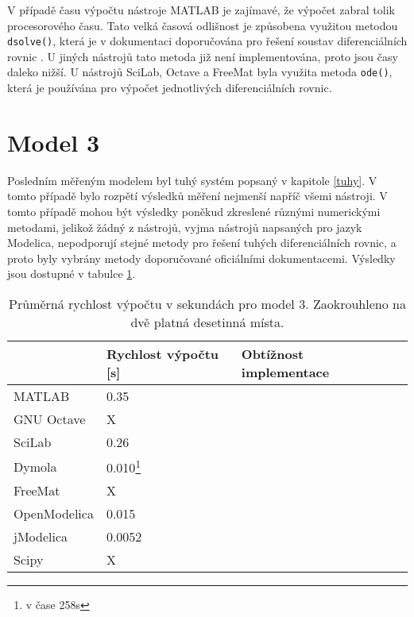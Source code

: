 
V případě času výpočtu nástroje MATLAB je zajímavé, že výpočet zabral tolik procesorového času. Tato velká časová odlišnost je způsobena využitou metodou \texttt{dsolve()}, která je v dokumentaci doporučována pro řešení soustav diferenciálních rovnic \cite{MATLAB:2010}. U jiných nástrojů tato metoda již není implementována, proto jsou časy daleko nižší. U nástrojů SciLab, Octave a FreeMat byla využita metoda \texttt{ode()}, která je používána pro výpočet jednotlivých diferenciálních rovnic.

\section{Model 3}
\label{srovnani-tuhy}
Posledním měřeným modelem byl tuhý systém popsaný v kapitole \ref{tuhy}. V tomto případě bylo rozpětí výsledků měření nejmenší napříč všemi nástroji. V tomto případě mohou být výsledky poněkud zkreslené různými numerickými metodami, jelikož žádný z nástrojů, vyjma nástrojů napsaných pro jazyk Modelica, nepodporují stejné metody pro řešení tuhých diferenciálních rovnic, a proto byly vybrány metody doporučované oficiálními dokumentacemi. Výsledky jsou dostupné v tabulce \ref{tab:tuhy-tabulka}.
\begin{savenotes}
\begin{table}[ht]
\centering
\begin{tabular}{|l|l|l|l|}
\hline
             & Rychlost výpočtu {[}s{]} & Obtížnost implementace &  \\ \hline
MATLAB       &         0.35                 &  &  \\ \hline
GNU Octave   &             X             &  &  \\ \hline
SciLab       &          0.26                &  &  \\ \hline
Dymola       &        0.010\footnote{v čase 258s}                  &  &  \\ \hline
FreeMat &                 X         &  &  \\ \hline
OpenModelica    &     0.015                     &  &  \\ \hline
jModelica        &    0.0052                      &  &  \\ \hline
 Scipy            &      X                    &  &  \\ \hline
\end{tabular}
\caption{Průměrná rychlost výpočtu v sekundách pro model 3. Zaokrouhleno na dvě platná desetinná místa.}
\label{tab:tuhy-tabulka}
\end{table}
\end{savenotes}

